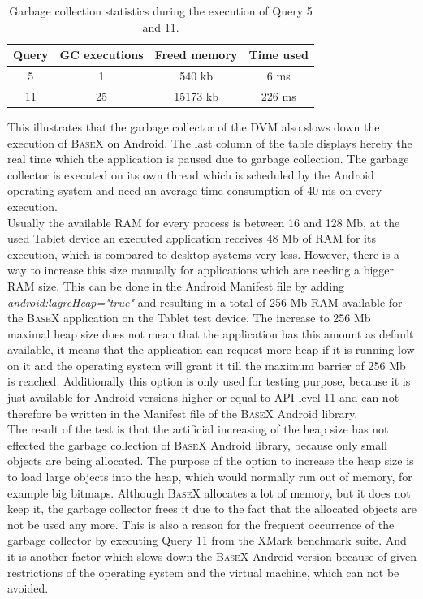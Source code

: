 \begin{table}[htpb]
	\centering
	\begin{tabular}{|c|c|c|c|}
		\hline
		Query&GC executions&Freed memory&Time used\\
		\hline
		5&1&540 kb&6 ms\\
		\hline
		11&25&15173 kb&226 ms\\
		\hline
	\end{tabular}
	\caption{Garbage collection statistics during the execution of Query 5 and 11.}
	\label{tab:gc-stats}
\end{table}

This illustrates that the garbage collector of the DVM also slows down the execution of \textsc{BaseX} on Android.
The last column of the table displays hereby the real time which the application is paused due to garbage collection.
The garbage collector is executed on its own thread which is scheduled by the Android operating system and need an average time consumption of 40 ms on every execution.\\
Usually the available RAM for every process is between 16 and 128 Mb, at the used Tablet device an executed application receives 48 Mb of RAM for its execution, which is compared to desktop systems very less.
However, there is a way to increase this size manually for applications which are needing a bigger RAM size.
This can be done in the Android Manifest file by adding \textit{android:lagreHeap="true"} and resulting in a total of 256 Mb RAM available for the \textsc{BaseX} application on the Tablet test device.
The increase to 256 Mb maximal heap size does not mean that the application has this amount as default available, it means that the application can request more heap if it is running low on it and the operating system will grant it till the maximum barrier of 256 Mb is reached.
Additionally this option is only used for testing purpose, because it is just available for Android versions higher or equal to API level 11 and can not therefore be written in the Manifest file of the \textsc{BaseX} Android library.\\
The result of the test is that the artificial increasing of the heap size has not effected the garbage collection of \textsc{BaseX} Android library, because only small objects are being allocated.
The purpose of the option to increase the heap size is to load large objects into the heap, which would normally run out of memory, for example big bitmaps.
Although \textsc{BaseX} allocates a lot of memory, but it does not keep it, the garbage collector frees it due to the fact that the allocated objects are not be used any more.
This is also a reason for the frequent occurrence of the garbage collector by executing Query 11 from the XMark benchmark suite.
And it is another factor which slows down the \textsc{BaseX} Android version because of given restrictions of the operating system and the virtual machine, which can not be avoided.




